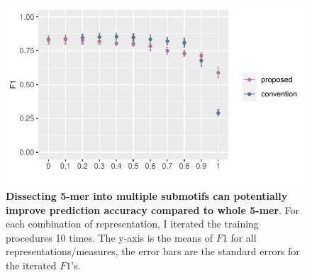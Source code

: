 \begin{figure}[h!]
    \centering
    \includegraphics[scale=1]{graphics/f1_combined.pdf}
    \caption{\textbf{Dissecting 5-mer into multiple submotifs can potentially improve prediction accuracy compared to whole 5-mer}. For each combination of representation, I iterated the training procedures 10 times. The y-axis is the means of $F1$ for all representations/measures, the error bars are the standard errors for the iterated $F1$'s.}
    \label{fig:f1_combined}
\end{figure}
